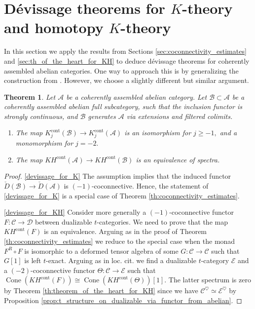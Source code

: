 \documentclass[11pt,leqno]{amsart}
\newtheorem{theo}{Theorem}[section]
\numberwithin{equation}{section}
\newcommand{\Cone}{\operatorname{Cone}}
\newcommand{\cont}{\operatorname{cont}}
\newcommand{\cD}{{\mathcal D}}
\newcommand{\cA}{{\mathcal A}}
\newcommand{\cB}{{\mathcal B}}
\newcommand{\cC}{{\mathcal C}}
\newcommand{\cE}{{\mathcal E}}
\begin{document}
\section{D\'evissage theorems for $K$-theory and homotopy $K$-theory}
\label{sec:devissage}

In this section we apply the results from Sections \ref{sec:coconnectivity_estimates} and \ref{sec:th_of_the_heart_for_KH} to deduce d\'evissage theorems for coherently assembled abelian categories. One way to approach this is by generalizing the construction from \cite[Theorem 0.3]{E25b}. However, we choose a slightly different but similar argument.

\begin{theo}\label{th:devissage_for_K_and_KH}
Let $\cA$ be a coherently assembled abelian category. Let $\cB\subset\cA$ be a coherently assembled abelian full subcategory, such that the inclusion functor is strongly continuous, and $\cB$ generates $\cA$ via extensions and filtered colimits. 

\begin{enumerate}[label=(\roman*),ref=(\roman*)]
\item The map $K_j^{\cont}(\cB)\to K_j^{\cont}(\cA)$ is an isomorphism for $j\geq -1,$ and a monomorphism for $j=-2.$ \label{devissage_for_K}
\item The map $KH^{\cont}(\cA)\to KH^{\cont}(\cB)$ is an equivalence of spectra. \label{devissage_for_KH}
\end{enumerate}
\end{theo}

\begin{proof}
\ref{devissage_for_K} The assumption implies that the induced functor $\check{D}(\cB)\to\check{D}(\cA)$ is $(-1)$-coconnective. Hence, the statement of \ref{devissage_for_K} is a special case of Theorem \ref{th:coconnectivity_estimates}.

\ref{devissage_for_KH} Consider more generally a $(-1)$-coconnective functor $F:\cC\to\cD$ between dualizable $t$-categories. We need to prove that the map $KH^{\cont}(F)$ is an equivalence. Arguing as in the proof of Theorem \ref{th:coconnectivity_estimates} we reduce to the special case when the monad $F^R\circ F$ is isomorphic to a deformed tensor algebra of some $G:\cC\to\cC$ such that $G[1]$ is left $t$-exact. Arguing as in loc. cit. we find a dualizable $t$-category $\cE$ and a $(-2)$-coconnective functor $\Theta:\cC\to\cE$ such that $\Cone(KH^{\cont}(F))\cong \Cone(KH^{\cont}(\Theta))[1].$ The latter spectrum is zero by Theorem \ref{th:theorem_of_the_heart_for_KH} since we have $\cC^{\heartsuit}\simeq\cE^{\heartsuit}$ by Proposition \ref{prop:t_structure_on_dualizable_via_functor_from_abelian}. 
\end{proof}
\end{document}
